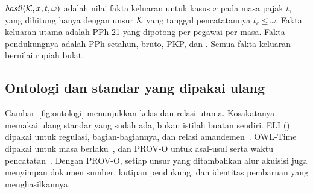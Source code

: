 \begin{definisi}
\label{def:hasil}
$\mathit{hasil}(\mathcal{K}, x, t, \omega)$ adalah nilai fakta keluaran untuk kasus $x$ pada masa pajak $t$, yang dihitung hanya dengan unsur $\mathcal{K}$ yang tanggal pencatatannya $t_c \le \omega$. Fakta keluaran utama adalah PPh 21 yang dipotong per pegawai per masa. Fakta pendukungnya adalah PPh setahun, bruto, PKP, dan . Semua fakta keluaran bernilai rupiah bulat.
\end{definisi}


\subsection{Ontologi dan standar yang dipakai ulang}
\label{subsec:ontologi}

Gambar~\ref{fig:ontologi} menunjukkan kelas dan relasi utama. Kosakatanya memakai ulang standar yang sudah ada, bukan istilah buatan sendiri. ELI () dipakai untuk regulasi, bagian-bagiannya, dan relasi amandemen~\cite{publicationsoffice2026eli}. OWL-Time dipakai untuk masa berlaku~\cite{cox2017owltime}, dan PROV-O untuk asal-usul serta waktu pencatatan~\cite{lebo2013provo}. Dengan PROV-O, setiap unsur yang ditambahkan alur akuisisi juga menyimpan dokumen sumber, kutipan pendukung, dan identitas pembaruan yang menghasilkannya.

